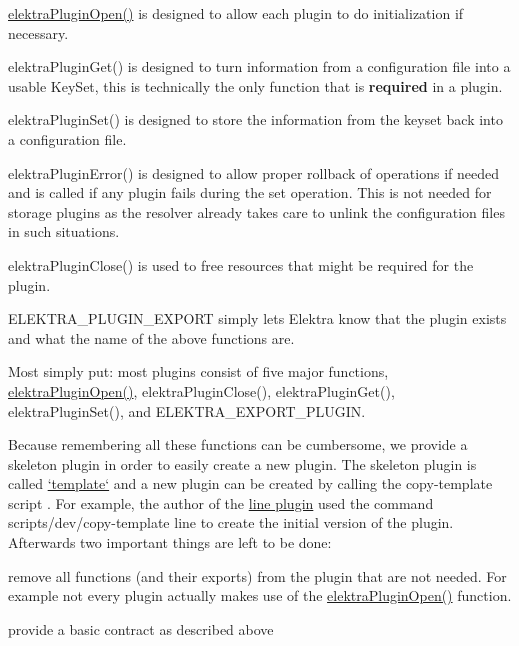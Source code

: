 \begin{DoxyItemize}
\item {\ttfamily \hyperlink{elektra_2plugin_8c_a32a70a7876542c51d153164ac5108a57}{elektra\+Plugin\+Open()}} is designed to allow each plugin to do initialization if necessary.
\item {\ttfamily elektra\+Plugin\+Get()} is designed to turn information from a configuration file into a usable {\ttfamily Key\+Set}, this is technically the only function that is {\bfseries required} in a plugin.
\item {\ttfamily elektra\+Plugin\+Set()} is designed to store the information from the keyset back into a configuration file.
\item {\ttfamily elektra\+Plugin\+Error()} is designed to allow proper rollback of operations if needed and is called if any plugin fails during the set operation. This is not needed for storage plugins as the resolver already takes care to unlink the configuration files in such situations.
\item {\ttfamily elektra\+Plugin\+Close()} is used to free resources that might be required for the plugin.
\item {\ttfamily E\+L\+E\+K\+T\+R\+A\+\_\+\+P\+L\+U\+G\+I\+N\+\_\+\+E\+X\+P\+O\+RT} simply lets Elektra know that the plugin exists and what the name of the above functions are.
\end{DoxyItemize}

Most simply put\+: most plugins consist of five major functions, {\ttfamily \hyperlink{elektra_2plugin_8c_a32a70a7876542c51d153164ac5108a57}{elektra\+Plugin\+Open()}}, {\ttfamily elektra\+Plugin\+Close()}, {\ttfamily elektra\+Plugin\+Get()}, {\ttfamily elektra\+Plugin\+Set()}, and {\ttfamily E\+L\+E\+K\+T\+R\+A\+\_\+\+E\+X\+P\+O\+R\+T\+\_\+\+P\+L\+U\+G\+IN}.

Because remembering all these functions can be cumbersome, we provide a skeleton plugin in order to easily create a new plugin. The skeleton plugin is called \hyperlink{autotoc_md685_src_plugins_template_README_md}{`template`} and a new plugin can be created by calling the copy-\/template script . For example, the author of the \hyperlink{autotoc_md374_src_plugins_line_README_md}{line plugin} used the command {\ttfamily scripts/dev/copy-\/template line} to create the initial version of the plugin. Afterwards two important things are left to be done\+:


\begin{DoxyItemize}
\item remove all functions (and their exports) from the plugin that are not needed. For example not every plugin actually makes use of the {\ttfamily \hyperlink{elektra_2plugin_8c_a32a70a7876542c51d153164ac5108a57}{elektra\+Plugin\+Open()}} function.
\item provide a basic contract as described above
\end{DoxyItemize}

